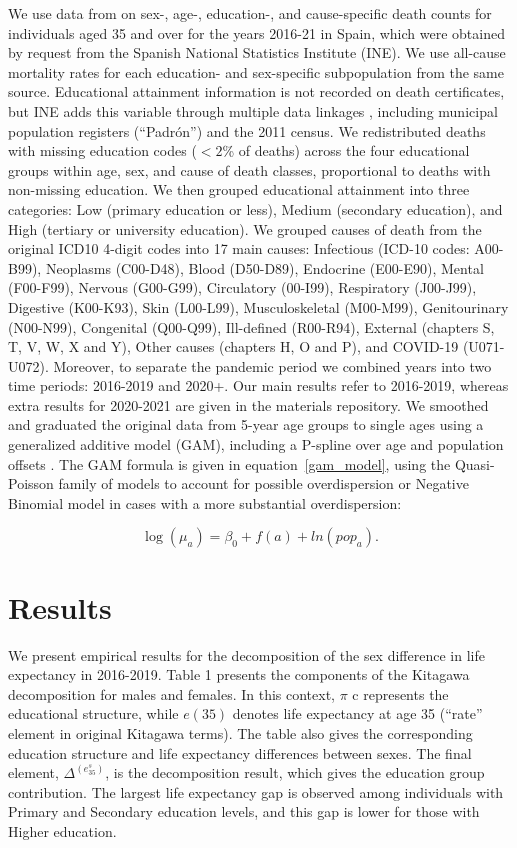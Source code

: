 \documentclass[12pt, sn-apa,pdflatex,letterpaper]{sn-jnl}
\begin{document}
We use data from \citet{trias2023age} on sex-, age-, education-, and cause-specific death counts for individuals aged 35 and over for the years 2016-21 in Spain, which were obtained by request from the Spanish National Statistics Institute (INE). We use all-cause mortality rates for each education- and sex-specific subpopulation from the same source. Educational attainment information is not recorded on death certificates, but INE adds this variable through multiple data linkages \citet{ine2020asignacion}, including municipal population registers (``Padrón'') and the 2011 census. We redistributed deaths with missing education codes ($<2$\% of deaths) across the four educational groups within age, sex, and cause of death classes, proportional to deaths with non-missing education. We then grouped educational attainment into three categories: Low (primary education or less), Medium (secondary education), and High (tertiary or university education). We grouped causes of death from the original ICD10 4-digit codes into 17 main causes: Infectious (ICD-10 codes: A00-B99), Neoplasms (C00-D48), Blood (D50-D89), Endocrine (E00-E90), Mental (F00-F99), Nervous (G00-G99), Circulatory (00-I99), Respiratory (J00-J99), Digestive (K00-K93), Skin (L00-L99), Musculoskeletal (M00-M99), Genitourinary (N00-N99), Congenital (Q00-Q99), Ill-defined (R00-R94), External (chapters S, T, V, W, X and Y), Other causes (chapters H, O and P), and COVID-19 (U071-U072). Moreover, to separate the pandemic period we combined years into two time periods: 2016-2019 and 2020+. Our main results refer to 2016-2019, whereas extra results for 2020-2021 are given in the materials repository.
We smoothed and graduated the original data from 5-year age groups to single ages using a generalized additive model (GAM), including a P-spline over age and population offsets \citep{mgcv2011,mgcv2017}. The GAM formula is given in equation~\eqref{gam_model}, using the Quasi-Poisson family of models to account for possible overdispersion or Negative Binomial model in cases with a more substantial overdispersion:

\begin{equation}
\label{gam_model}
\log(\mu_a) = \beta_0 + f(a) + ln(pop_a)
\textrm{.}
\end{equation}

\FloatBarrier
\section*{Results}\label{results}
We present empirical results for the decomposition of the sex difference in life expectancy in 2016-2019.
Table 1 presents the components of the Kitagawa decomposition for males and females. In this context,  $\pi$ c represents the educational structure, while $e(35)$ denotes life expectancy at age 35 (``rate'' element in original Kitagawa terms). The table also gives the corresponding education structure and life expectancy differences between sexes. The final element,  $\Delta^{(e_{35}^s)}$, is the decomposition result, which gives the education group contribution.
The largest life expectancy gap is observed among individuals with Primary and Secondary education levels, and this gap is lower for those with Higher education.
\end{document}
